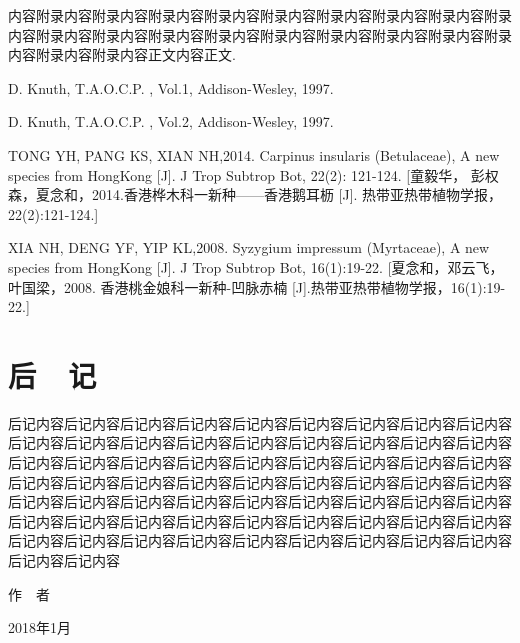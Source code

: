 \documentclass[utf8]{book}
\begin{document}
内容附录内容附录内容附录内容附录内容附录内容附录内容附录内容附录内容附录内容附录内容附录内容附录内容附录内容附录内容附录内容附录内容附录内容附录内容附录内容附录内容正文内容正文\cite{DK1}.

\renewcommand\indexname{索~~引}

\printindex


\backmatter


\begin{thebibliography}{参考文献}

 D. Knuth, T.A.O.C.P. , Vol.1, Addison-Wesley, 1997.

 D. Knuth, T.A.O.C.P. , Vol.2, Addison-Wesley, 1997.

 TONG YH, PANG KS, XIAN NH,2014. Carpinus insularis (Betulaceae), A new species from HongKong [J]. J Trop Subtrop Bot, 22(2): 121-124. [童毅华， 彭权森，夏念和，2014.香港桦木科一新种——香港鹅耳枥 [J]. 热带亚热带植物学报，22(2):121-124.]

 XIA NH, DENG YF, YIP KL,2008. Syzygium impressum (Myrtaceae), A new species from HongKong [J]. J Trop Subtrop Bot, 16(1):19-22. [夏念和，邓云飞，叶国梁，2008. 香港桃金娘科一新种-凹脉赤楠 [J].热带亚热带植物学报，16(1):19-22.]

\end{thebibliography}

\chapter{后~~记}

后记内容后记内容后记内容后记内容后记内容后记内容后记内容后记内容后记内容后记内容后记内容后记内容后记内容后记内容后记内容后记内容后记内容后记内容后记内容后记内容后记内容后记内容后记内容后记内容后记内容后记内容后记内容后记内容后记内容后记内容后记内容后记内容后记内容后记内容后记内容后记内容后记内容后记内容后记内容后记内容后记内容后记内容后记内容后记内容后记内容后记内容后记内容后记内容后记内容后记内容后记内容后记内容后记内容后记内容后记内容后记内容后记内容后记内容后记内容后记内容后记内容后记内容后记内容后记内容后记内容

\begin{flushright}

作~~者~~~~~~~~~

2018年1月~~~~~

\end{flushright}
\end{document}
